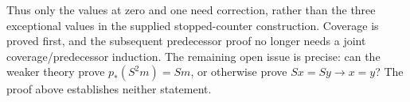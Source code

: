 Thus only the values at zero and one need correction, rather than
the three exceptional values in the supplied stopped-counter
construction. Coverage is proved first, and the subsequent
predecessor proof no longer needs a joint coverage/predecessor
induction. The remaining open issue is precise: can the weaker
theory prove $p_*(S^2m)=Sm$, or otherwise prove $Sx=Sy\to x=y$?
The proof above establishes neither statement.
